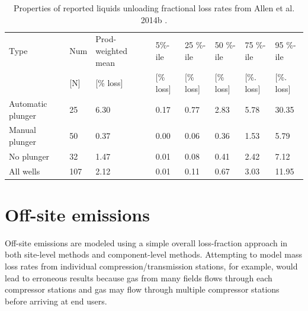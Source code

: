 \documentclass[11pt]{report}
\begin{document}
{{{{\begin{table}
\begin{scriptsize}
\caption{Properties of reported liquids unloading fractional loss rates from Allen et al. 2014b \cite{Allen2014b}.}
\label{tab:LU_emissions_table}
\begin{tabular*}{1\columnwidth}{p{}p{}p{}p{}p{}p{}p{}p{}}
\toprule
Type                                           & Num 		& Prod-weighted mean 	& 5\%-ile 			& 25 \%-ile 		& 50 \%-ile 		& 75 \%-ile		& 95 \%-ile	 \\
                                                  & {[}N{]}       	& {[}\% loss{]}           		& {[}\% loss{]}   		&{[}\% loss{]}   		& {[}\% loss{]}   		& {[}\%. loss{]}		& {[}\%. loss{]}\\
\midrule
Automatic plunger                    	& 25                 & 6.30               			& 0.17            	& 0.77                 	& 2.83               	& 5.78               	& 30.35   \\
Manual plunger            		& 50                 & 0.37                      		& 0.00             	& 0.06                  	& 0.36               	& 1.53                	&  5.79 \\
No plunger       				& 32                 & 1.47                     		& 0.01           	& 0.08                  	& 0.41               	& 2.42                	&  7.12 \\
All wells 					& 107               & 2.12                       		& 0.01              	& 0.11                   	& 0.67                	& 3.03              		&  11.95  \\
\bottomrule
\end{tabular*}
\end{scriptsize}
\end{table}






\section{Off-site emissions}

Off-site emissions are modeled using a simple overall loss-fraction approach in both site-level methods and component-level methods. Attempting to model mass loss rates from individual compression/transmission stations, for example, would lead to erroneous results because gas from many fields flows through each compressor stations and gas may flow through multiple compressor stations before arriving at end users.

}}}}
\end{document}
